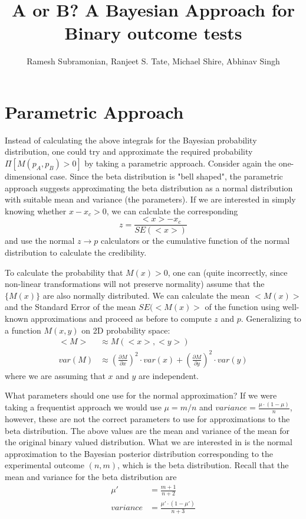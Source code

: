 \documentclass[12pt]{report}
\newcommand{\beq}{\begin{equation}} %
\newcommand{\eeq}{\end{equation}} %
\newcommand{\bdm}{\begin{displaymath}} %
\newcommand{\edm}{\end{displaymath}} %
\begin{document}
\title{A or B? A Bayesian Approach for Binary outcome tests}
\author{Ramesh Subramonian, Ranjeet S. Tate, Michael Shire, Abhinav Singh}
\date{}
\maketitle

\section{Parametric Approach}

Instead of calculating the above integrals for the Bayesian
probability distribution, one could try and approximate the required
probability \(\Pi[M(p_A, p_B)>0]\) by taking a parametric
approach. Consider again the one-dimensional case. Since the beta
distribution is "bell shaped", the parametric approach suggests
approximating the beta distribution as a normal distribution with
suitable mean and variance (the parameters). If we are interested in
simply knowing whether \(x-x_c>0\), we can calculate the corresponding
\bdm
z = \frac{<x>-x_c}{SE(<x>)}
\edm
and use the normal \(z\rightarrow p\) calculators or
the cumulative function of
the normal distribution to calculate the credibility.

To calculate the probability that \(M(x)>0\), one can
(quite incorrectly, since non-linear transformations will not preserve
normality) assume that the \(\{M(x)\}\) are also normally
distributed. We can calculate the mean \(<M(x)>\) and the
Standard Error of the mean \(SE(<M(x)>\) of the function using
well-known approximations and proceed as before to compute \(z\) and
\(p\). Generalizing to a function \(M(x,y)\) on 2D probability space:
\beq
\begin{split}
  <M> &\approx M(<x>,<y>)\\
  var(M) &\approx \left(\frac{\partial M}{\partial x}\right)^2\cdot var(x)
  + \left(\frac{\partial M}{\partial y}\right)^2\cdot var(y)
\end{split}
\eeq
where we are assuming that \(x\) and \(y\) are independent.

What parameters should one use for the normal approximation? If we were
taking a frequentist approach we would use \(\mu =m/n\)
and \(variance = \frac{\mu\cdot(1-\mu)}{n}\), however, these are
not the correct parameters to use for approximations to the beta
distribution. The above values are the mean and variance of the mean
for the original
binary valued distribution. What we are interested in is the normal
approximation to the Bayesian posterior distribution corresponding to the
experimental outcome \( (n,m) \), which is the beta distribution. Recall that
the mean and variance for the beta distribution are
\beq
\begin{split}
  \mu' &= \frac{m+1}{n+2}\\
  variance &= \frac{\mu'\cdot (1-\mu')}{n+3}
\end{split}
\eeq
\end{document}

